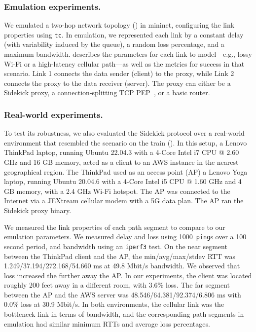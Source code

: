 \subsubsection{Emulation experiments.}



We emulated a two-hop network topology () in
mininet, configuring the link properties using \texttt{tc}.
In emulation, we represented
each link by a constant delay (with variability induced by the queue), a random
loss percentage, and a maximum bandwidth.
 describes the parameters
for each link to model---e.g., lossy Wi-Fi or a high-latency cellular
path---as well as the metrics for success in that scenario.
Link 1 connects the data sender (client) to the proxy,
while Link 2 connects the proxy to the data receiver (server).
The proxy can either be a Sidekick proxy,
a connection-splitting TCP PEP~\cite{caini2006pepsal}, or a basic router.

\subsubsection{Real-world experiments.}

To test its robustness, we also evaluated the Sidekick protocol over a
real-world environment that resembled the scenario on the train
(). In this setup, a Lenovo ThinkPad laptop,
running Ubuntu 22.04.3 with a 4-Core Intel i7 CPU @ 2.60 GHz and 16 GB memory,
acted as a client to an AWS instance in the nearest geographical region. The
ThinkPad used as an access point (AP) a Lenovo Yoga laptop, running Ubuntu
20.04.6 with a 4-Core Intel i5 CPU @ 1.60 GHz and 4 GB memory, with a 2.4 GHz
Wi-Fi hotspot. The AP was connected to the Internet via a JEXtream cellular
modem with a 5G data plan. The AP ran the Sidekick proxy binary.

We measured the link properties of each path segment to compare to
our emulation parameters. We measured delay and loss using 1000~\texttt{ping}s
over a 100 second period, and bandwidth using an \texttt{iperf3} test.
On the near segment between the ThinkPad client and the AP,
the min/avg/max/stdev RTT was 1.249/37.194/272.168/54.660 ms
at 49.8 Mbit/s bandwidth. We observed that loss increased
the further away the AP. In our experiments, the client was located roughly
200 feet away in a different room, with 3.6\% loss.
The far segment between the AP and the AWS server was
48.546/64.381/92.374/6.806 ms with 0.0\% loss at 30.9 Mbit/s.
In both environments, the cellular link was the bottleneck link in terms of
bandwidth, and the corresponding path segments in emulation had similar
minimum RTTs and average loss percentages.

